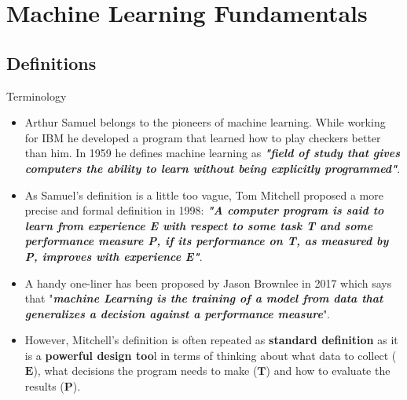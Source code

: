 \documentclass[document.tex]{subfiles}
\begin{document}
    \section{Machine Learning Fundamentals}
        
    \subsection{Definitions}
    
    \begin{frame}{Terminology}
        \begin{itemize}
            \item Arthur Samuel belongs to the pioneers of machine learning. While working for IBM he developed a program that learned how to play checkers better than him. In 1959 he defines machine learning as \textbf{\textit{"field of study that gives computers the ability to learn without being explicitly programmed"}}.
            \item As Samuel's definition is a little too vague, Tom Mitchell proposed a more precise and formal definition in 1998: \textbf{\textit{"A computer program is said to learn from experience E with respect to some task T and some performance measure P, if its performance on T, as measured by P, improves with experience E"}}.
            \item A handy one-liner has been proposed by Jason Brownlee in 2017 which says that "\textbf{\textit{machine Learning is the training of a model from data that generalizes a decision against a performance measure}}".
            \item However, Mitchell's definition is often repeated as \textbf{standard definition} as it is a \textbf{powerful design too}l in terms of thinking about what data to collect ($\pmb{E}$), what decisions the program needs to make ($\pmb{T}$) and how to evaluate the results ($\pmb{P}$).
        \end{itemize}
    \end{frame}
\end{document}
